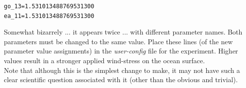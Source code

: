 \begin{enumerate}
\vspace{-1mm}\small\begin{verbatim}
go_13=1.531013488769531300
ea_11=1.531013488769531300
\end{verbatim}\normalsize\vspace{-1mm}
Somewhat bizarrely ... it appears twice ... with different parameter names. Both parameters must be changed to the same value. Place these lines (of the new parameter value assignments) in the \textit{user-config} file for the experiment. Higher values result in a stronger applied wind-stress on the ocean surface.
\vspace{1mm}
\\Note that although this is the simplest change to make, it may not have such a clear scientific question associated with it (other than the obvious and trivial).
\end{enumerate}

